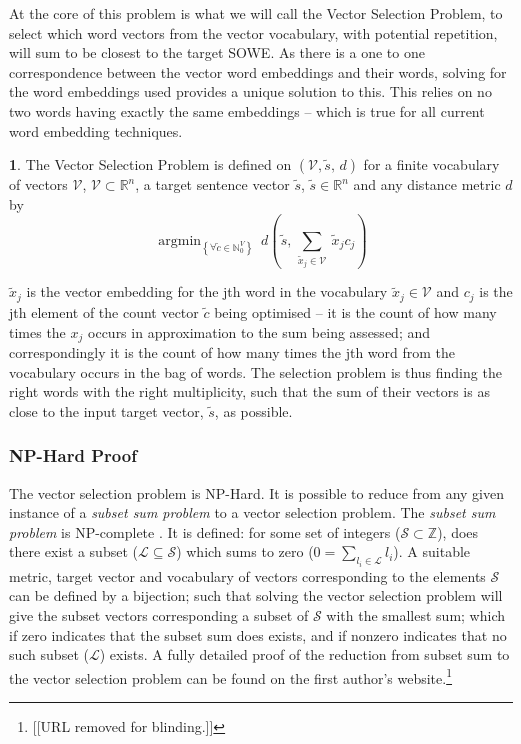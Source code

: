 \documentclass[11pt]{article}
\theoremstyle{plain}
\theoremstyle{definition}
\newtheorem{defn}[thm]{\protect\definitionname}
\providecommand{\definitionname}{Definition}
\DeclareMathOperator*{\argmin}{argmin}
\begin{document}
At the core of this problem is what we will call the Vector Selection Problem, to select which word vectors from the vector vocabulary, with potential repetition, will sum to be closest to the target SOWE.
As there is a one to one correspondence between the vector word embeddings and their words, solving for the word embeddings used provides a unique solution to this. This relies on no two words having exactly the same embeddings -- which is true for all current word embedding techniques.

\renewcommand{\c}{\tilde{c}}
\newcommand{\s}{\tilde{s}}
\newcommand{\x}{\tilde{x}}
\renewcommand{\t}{\tilde{t}}
\newcommand{\N}{\mathbb{N}}
\newcommand{\R}{\mathbb{R}}
\newcommand{\V}{\mathcal{V}}

\begin{defn}{The Vector Selection Problem}
	is defined on $(\V, \s,\,d)$ for a finite vocabulary of vectors $\V$, $\V\subset{\R}^{n}$, a target sentence vector $ \s$, $ \s\in\R^{n}$ and any distance metric $d$ by
		\[
		\argmin_{\left\{ \forall\c\in\N_{0}^{V}\right\} }\:d( \s,\,\sum_{\x_j\in\V}\:\x_{j}c_{j})
		\]
						
		$\x_{j}$ is the vector embedding for the jth word in the vocabulary
		$\x_{j}\in\V$ and $c_j$ is the jth element of the count vector $\c$ being optimised -- it is the count of how many times the $x_j$ occurs in approximation to the sum being assessed; and correspondingly it is the count of how many times the jth word from the vocabulary occurs in the bag of words.
		The selection problem is thus finding the right words with the right multiplicity, such that the sum of their vectors is as close to the input target vector, $\s$, as possible.
\end{defn}

\subsubsection{NP-Hard Proof}
The vector selection problem is NP-Hard. It is possible to reduce from any given instance of a \emph{subset sum problem} to a vector selection problem. The \emph{subset sum problem} is NP-complete \parencite{karp1972reducibility}. It is defined: for some set of integers ($\mathcal{S}\subset\mathbb{Z}$), does there exist a subset ($\mathcal{L}\subseteq\mathcal{S}$) which sums to zero ($0=\sum_{l_i\in \mathcal{L}} l_i$).  A suitable metric, target vector and  vocabulary of vectors corresponding to the elements $\mathcal{S}$ can be defined by a bijection; such that solving the vector selection problem will give the subset vectors corresponding a subset of $\mathcal{S}$ with the smallest sum; which if zero indicates that the subset sum does exists, and if nonzero indicates that no such subset ($\mathcal{L}$) exists. A fully detailed proof of the reduction from subset sum to the vector selection problem can be found on the first author's website.\footnote{[[URL removed for blinding.]]}
\end{document}
